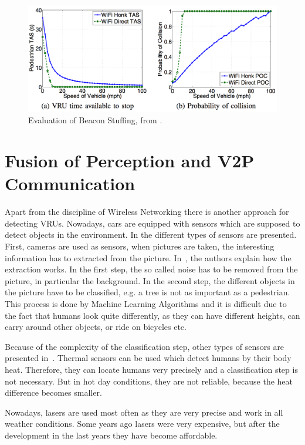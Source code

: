 \documentclass[]{ccs-thesis}
\begin{document}
\begin{figure}[h]
	\centering
	\includegraphics[width=1\textwidth]{figures/6_beacon}
	\caption{Evaluation of Beacon Stuffing, from \cite{beacon}.}%
	\label{fig:beacon}%
\end{figure}

\section{Fusion of Perception and V2P Communication}\label{sec:fusion}

Apart from the discipline of Wireless Networking there is another approach for detecting \acp{VRU}. Nowadays, cars are equipped with sensors which are supposed to detect objects in the environment. In \cite{survey} the different types of sensors are presented. First, cameras are used as sensors, when pictures are taken, the interesting information has to extracted from the picture. In~\cite{2010perception}, the authors explain how the extraction works. In the first step, the so called noise has to be removed from the picture, in particular the background. In the second step, the different objects in the picture have to be classified, e.g. a tree is not as important as a pedestrian. This process is done by Machine Learning Algorithms and it is difficult due to the fact that humans look quite differently, as they can have different heights, can carry around other objects, or ride on bicycles etc.

Because of the complexity of the classification step, other types of sensors are presented in~\cite{survey}. Thermal sensors can be used which detect humans by their body heat. Therefore, they can locate humans very precisely and a classification step is not necessary. But in hot day conditions, they are not reliable, because the heat difference becomes smaller.

Nowadays, lasers are used most often as they are very precise and work in all weather conditions. Some years ago lasers were very expensive, but after the development in the last years they have become affordable.
\end{document}
